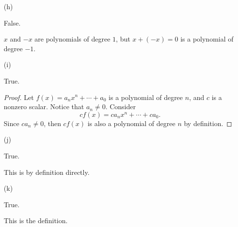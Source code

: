 \begin{Exercise}
\begin{enumerate}[(a)]
\item [(h)]
\begin{answer}
False.
\end{answer}
\begin{solution}
$x$ and $-x$ are polynomials of degree $1$, but $x+(-x) = 0$ is a polynomial of degree $-1$.
\end{solution}

\item [(i)]
\begin{answer}
True.
\end{answer}
\begin{proof}
Let $f(x) = a_n x^n + \cdots + a_0$ is a polynomial of degree $n$, and $c$ is a nonzero scalar. Notice that $a_n \neq 0$. Consider 
$$
cf(x) = c a_n x^n + \cdots + c a_0.
$$
Since $c a_n \neq 0$, then $cf(x)$ is also a polynomial of degree $n$ by definition.
\end{proof}

\item [(j)]
\begin{answer}
True.
\end{answer}
\begin{solution}
This is by definition directly.
\end{solution}

\item [(k)]
\begin{answer}
True.
\end{answer}
\begin{solution}
This is the definition.
\end{solution}
\end{enumerate}
\end{Exercise}